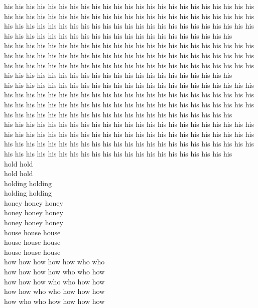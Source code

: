 his his his his his his his his his his his his his his his his his his his his his his his his his his his his his his his his his his his his his his his his his his his his his his his his his his his his his his his his his his his his his his his his his his his his his his his his his his his his his his his his his his his his his his his his his his\\
his his his his his his his his his his his his his his his his his his his his his his his his his his his his his his his his his his his his his his his his his his his his his his his his his his his his his his his his his his his his his his his his his his his his his his his his his his his his his his his his his his his his his his his his his his\\
his his his his his his his his his his his his his his his his his his his his his his his his his his his his his his his his his his his his his his his his his his his his his his his his his his his his his his his his his his his his his his his his his his his his his his his his his his his his his his his his his his his his his his his his his his\\
his his his his his his his his his his his his his his his his his his his his his his his his his his his his his his his his his his his his his his his his his his his his his his his his his his his his his his his his his his his his his his his his his his his his his his his his his his his his his his his his his his his his his his his his his his\\
hold hold\\
hold hold\\
holding holding\\
holding holding\\
honey honey honey\\
honey honey honey\\
honey honey honey\\
house house house\\
house house house\\
house house house\\
how how how how how who who\\
how how how how who who how\\
how how how who who how how\\
how how who who how how how\\
how who who how how how how\\


